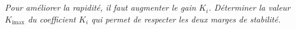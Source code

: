 \documentclass[10pt,fleqn]{article} %
\begin{document}
%
%
%
%
%
%
%
%
%

\subparagraph{}\textit{Pour améliorer la rapidité, il faut augmenter le gain $K_i$. Déterminer la valeur $K_{\text{imax}}$ du
coefficient $K_i$ qui permet de respecter les deux marges de stabilité.}
\end{document}
